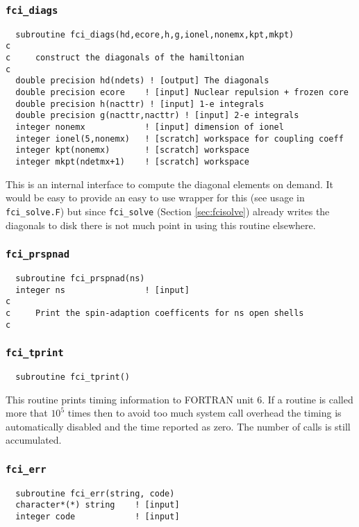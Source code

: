 \documentclass[fullpage,12pt,fleqn]{article}
\begin{document}
\subsubsection{{\tt fci\_diags}}
\begin{verbatim}
  subroutine fci_diags(hd,ecore,h,g,ionel,nonemx,kpt,mkpt)
c     
c     construct the diagonals of the hamiltonian 
c     
  double precision hd(ndets) ! [output] The diagonals
  double precision ecore    ! [input] Nuclear repulsion + frozen core
  double precision h(nacttr) ! [input] 1-e integrals
  double precision g(nacttr,nacttr) ! [input] 2-e integrals
  integer nonemx            ! [input] dimension of ionel
  integer ionel(5,nonemx)   ! [scratch] workspace for coupling coeff
  integer kpt(nonemx)       ! [scratch] workspace
  integer mkpt(ndetmx+1)    ! [scratch] workspace
\end{verbatim}
This is an internal interface to compute the diagonal elements on
demand.  It would be easy to provide an easy to use wrapper for this
(see usage in \verb!fci_solve.F!) but since \verb!fci_solve! (Section
\ref{sec:fcisolve}) already writes the diagonals to disk there is
not much point in using this routine elsewhere.

\subsubsection{{\tt fci\_prspnad}}
\begin{verbatim}
  subroutine fci_prspnad(ns)
  integer ns                ! [input]
c
c     Print the spin-adaption coefficents for ns open shells
c
\end{verbatim}

\subsubsection{{\tt fci\_tprint}}

\begin{verbatim}
  subroutine fci_tprint()
\end{verbatim}

This routine prints timing information to FORTRAN unit 6.  If a
routine is called more that $10^5$ times then to avoid too much system
call overhead the timing is automatically disabled and the time
reported as zero.  The number of calls is still accumulated.

\subsubsection{{\tt fci\_err}}
\begin{verbatim}
  subroutine fci_err(string, code)
  character*(*) string    ! [input]
  integer code            ! [input]
\end{verbatim}
\end{document}

